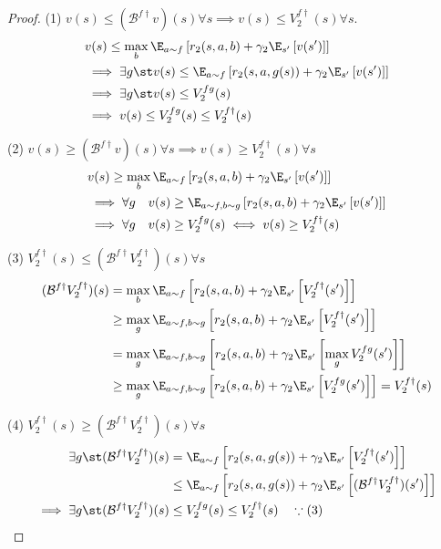 \documentclass[a4paper,10pt,dvipdfmx]{jsarticle}
\begin{document}
\begin{itemize}
    \begin{proof}
        (1) $v(s)\le (\mathcal{B}^{f\dag}v)(s)\forall s\implies v(s)\le V_2^{f\dag}(s)\forall s$.
        \begin{align}
            &v(s)\le \max_{b}\E_{a\sim f}\left[r_2(s,a,b)+\gamma_2\E_{s'}\left[v(s')\right]\right]\\
            &\implies \exists g \st v(s)\le \E_{a\sim f}\left[r_2(s,a,g(s))+\gamma_2\E_{s'}\left[v(s')\right]\right]\\
            &\implies \exists g \st v(s)\le V_2^{fg}(s)\\
            &\implies v(s)\le V_2^{fg}(s)\le V_2^{f\dag}(s)
        \end{align}

        (2) $v(s)\ge (\mathcal{B}^{f\dag}v)(s)\forall s\implies v(s)\ge V_2^{f\dag}(s)\forall s$
        \begin{align}
            &v(s)\ge \max_{b}\E_{a\sim f}\left[r_2(s,a,b)+\gamma_2\E_{s'}\left[v(s')\right]\right]\\
            &\implies \forall g\quad v(s)\ge \E_{a\sim f,b\sim g}\left[r_2(s,a,b)+\gamma_2\E_{s'}\left[v(s')\right]\right]\\
            &\implies \forall g\quad v(s)\ge V_2^{fg}(s)\iff v(s)\ge V_2^{f\dag}(s)
        \end{align}

        (3) $V_2^{f\dag}(s)\le (\mathcal{B}^{f\dag}V_2^{f\dag})(s)\forall s$
        \begin{align}
            (\mathcal{B}^{f\dag}V_2^{f\dag})(s)&=\max_{b}\E_{a\sim f}\left[r_2(s,a,b)+\gamma_2\E_{s'}\left[V_2^{f\dag}(s')\right]\right]\\
            &\ge \max_{g}\E_{a\sim f,b\sim g}\left[r_2(s,a,b)+\gamma_2\E_{s'}\left[V_2^{f\dag}(s')\right]\right]\\
            &= \max_{g}\E_{a\sim f,b\sim g}\left[r_2(s,a,b)+\gamma_2\E_{s'}\left[\max_{g}V_2^{fg}(s')\right]\right]\\
            &\ge \max_{g}\E_{a\sim f,b\sim g}\left[r_2(s,a,b)+\gamma_2\E_{s'}\left[V_2^{fg}(s')\right]\right]=V_2^{f\dag}(s)
        \end{align}

        (4) $V_2^{f\dag}(s)\ge (\mathcal{B}^{f\dag}V_2^{f\dag})(s)\forall s$
        \begin{align}
            \exists g\st (\mathcal{B}^{f\dag}V_2^{f\dag})(s)&=\E_{a\sim f}\left[r_2(s,a,g(s))+\gamma_2\E_{s'}\left[V_2^{f\dag}(s')\right]\right]\\
            & \le \E_{a\sim f}\left[r_2(s,a,g(s))+\gamma_2\E_{s'}\left[(\mathcal{B}^{f\dag}V_2^{f\dag})(s')\right]\right]\\
            \implies \exists g\st (\mathcal{B}^{f\dag}V_2^{f\dag})(s)&\le V_2^{fg}(s)\le V_2^{f\dag}(s)\quad\because (3) 
        \end{align}


\end{proof}
\end{itemize}
\end{document}
